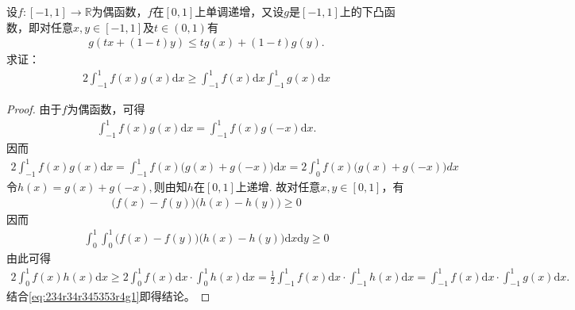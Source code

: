 \documentclass[../../main.tex]{subfiles}%
\begin{document}
\begin{example}
设$f:[-1,1]\to\mathbb{R}$为偶函数，$f$在$[0,1]$上单调递增，又设$g$是$[-1,1]$上的下凸函数，即对任意$x,y\in[-1,1]$及$t\in(0,1)$有
\begin{align*}
g(tx+(1-t)y)\leqslant tg(x)+(1-t)g(y).
\end{align*}
求证：
\begin{align*}
2\int_{-1}^1 f(x)g(x)\mathrm{d}x\geqslant \int_{-1}^1 f(x)\mathrm{d}x\int_{-1}^1 g(x)\mathrm{d}x
\end{align*}
\end{example}
\begin{proof}

由于$f$为偶函数，可得
\begin{align*}
\int_{-1}^1 f(x)g(x)\mathrm{d}x = \int_{-1}^1 f(x)g(-x)\mathrm{d}x.
\end{align*}
因而
\begin{align}\label{eq:234r34r345353r4g1}
2\int_{-1}^1 f(x)g(x)\mathrm{d}x = \int_{-1}^1 f(x)\bigl(g(x) + g(-x)\bigr)\mathrm{d}x = 2\int_0^1 f(x)\bigl(g(x) + g(-x)\bigr)dx
\end{align}
令$h(x) = g(x) + g(-x),$则由知$h$在$[0,1]$上递增.
故对任意$x,y \in [0,1]$，有
\begin{align*}
\bigl(f(x) - f(y)\bigr)\bigl(h(x) - h(y)\bigr) \geqslant 0
\end{align*}
因而
\begin{align*}
\int_0^1 \int_0^1 \bigl(f(x) - f(y)\bigr)\bigl(h(x) - h(y)\bigr)\mathrm{d}x\mathrm{d}y \geqslant 0
\end{align*}
由此可得
\begin{align*}
2\int_0^1 f(x)h(x)\mathrm{d}x \geqslant 2\int_0^1 f(x)\mathrm{d}x \cdot \int_0^1 h(x)\mathrm{d}x = \frac{1}{2}\int_{-1}^1 f(x)\mathrm{d}x \cdot \int_{-1}^1 h(x)\mathrm{d}x = \int_{-1}^1 f(x)\mathrm{d}x \cdot \int_{-1}^1 g(x)\mathrm{d}x.
\end{align*}
结合\eqref{eq:234r34r345353r4g1}即得结论。

\end{proof}
\end{document}
